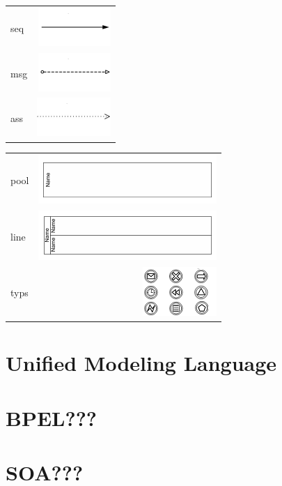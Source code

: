 \begin{tabular}{lr}
seq&\includegraphics{pic/seqflow.png}\\
msg&\includegraphics{pic/msgflow.png}\\
ass&\includegraphics{pic/association.png}\\
\end{tabular}

\begin{tabular}{lr}
pool&\includegraphics{pic/pool.png}\\
line&\includegraphics{pic/line.png}\\
typs&\includegraphics{pic/typs.png}\\
\end{tabular}

\section{Unified Modeling Language}

\section{BPEL???}

\section{SOA???}